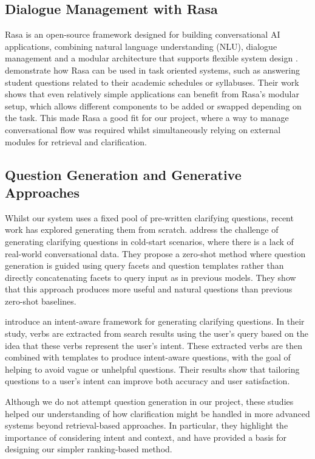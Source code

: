 \documentclass[11pt]{article}
\begin{document}
\subsection{Dialogue Management with Rasa}
Rasa is an open-source framework designed for building conversational AI applications, combining natural language understanding (NLU), dialogue management and a modular architecture that supports flexible system design \cite{Rasa2025,XaqtTeam2022}. \citet{Dinesh2021} demonstrate how Rasa can be used in task oriented systems, such as answering student questions related to their academic schedules or syllabuses. Their work shows that even relatively simple applications can benefit from Rasa's modular setup, which allows different components to be added or swapped depending on the task. This made Rasa a good fit for our project, where a way to manage conversational flow was required whilst simultaneously relying on external modules for retrieval and clarification.

\subsection{Question Generation and Generative Approaches}
Whilst our system uses a fixed pool of pre-written clarifying questions, recent work has explored generating them from scratch. \citet{Wang2023} address the challenge of generating clarifying questions in cold-start scenarios, where there is a lack of real-world conversational data. They propose a zero-shot method where question generation is guided using query facets and question templates rather than directly concatenating facets to query input as in previous models. They show that this approach produces more useful and natural questions than previous zero-shot baselines.

\citet{Zhao2024} introduce an intent-aware framework for generating clarifying questions. In their study, verbs are extracted from search results using the user's query based on the idea that these verbs represent the user's intent. These extracted verbs are then combined with templates to produce intent-aware questions, with the goal of helping to avoid vague or unhelpful questions. Their results show that tailoring questions to a user's intent can improve both accuracy and user satisfaction.

Although we do not attempt question generation in our project, these studies helped our understanding of how clarification might be handled in more advanced systems beyond retrieval-based approaches. In particular, they highlight the importance of considering intent and context, and have provided a basis for designing our simpler ranking-based method.
\end{document}

